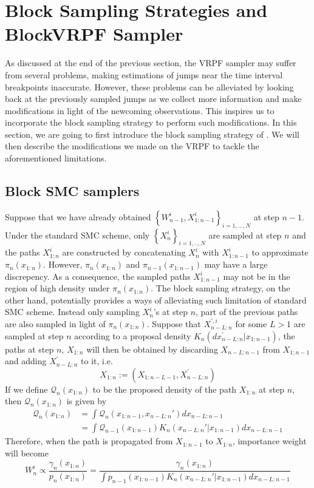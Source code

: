 \documentclass[12pt,a4paper]{article}
\begin{document}
\section{Block Sampling Strategies and BlockVRPF Sampler}
As discussed at the end of the previous section, the VRPF sampler may suffer from several problems, making estimations of jumps near the time interval breakpoints inaccurate. However, these problems can be alleviated by looking back at the previously sampled jumps as we collect more information and make modifications in light of the newcoming observations. This inspires us to incorporate the block sampling strategy to perform such modifications. In this section, we are going to first introduce the block sampling strategy of \cite{doucet2006efficient}. We will then describe the modifications we made on the VRPF to tackle the aforementioned limitations. 
\subsection{Block SMC samplers}
Suppose that we have already obtained $\left\{W_{n-1}^i,X_{1:n-1}^i\right\}_{i = 1,...,N}$ at step $n-1$. Under the standard SMC scheme, only \(\left\{X_n^{i}\right\}_{i=1,..,N}\) are sampled at step \(n\) and the paths \(X_{1:n}^i\) are constructed by concatenating \(X_n^i\) with \(X_{1:n-1}^i\) to approximate \(\pi_n(x_{1:n})\). However, \(\pi_n(x_{1:n})\) and \(\pi_{n-1}(x_{1:n-1})\) may have a large discrepency. As a consequence, the sampled paths \(X_{1:n-1}^i\) may not be in the region of high density under \(\pi_n(x_{1:n})\). The block sampling strategy, on the other hand, potentially provides a ways of alleviating such limitation of standard SMC scheme. Instead only sampling \(X_n^i\)'s at step \(n\), part of the previous paths are also sampled in light of \(\pi_n(x_{1:n})\). Suppose that $X_{n-L:n}^{',i}$ for some \(L>1\) are sampled at step \(n\) according to a proposal density $K_n(dx_{n-L:n}^{'}|x_{1:n-1})$, the paths at step \(n\), $X_{1:n}$ will then be obtained by discarding $X_{n-L:n-1}$ from $X_{1:n-1}$ and adding $X_{n-L:n}^{'}$ to it, i.e. 
\begin{equation}\label{eqn:BlockSMC Propogate}
    X_{1:n}:= (X_{1:n-L-1},X_{n-L:n}^{'})
\end{equation}
If we define $\mathcal{Q}_{n}(x_{1:n})$ to be the proposed density of the path $X_{1:n}$ at step $n$, then $\mathcal{Q}_n(x_{1:n})$ is given by
\begin{equation*}
    \begin{split}
        \mathcal{Q}_n(x_{1:n}) &= \int \mathcal{Q}_n(x_{1:n-1},x_{n-L:n}') dx_{n-L:n-1}\\
        &= \int \mathcal{Q}_{n-1}(x_{1:n-1}) K_n(x_{n-L:n}'|x_{1:n-1}) dx_{n-L:n-1}
    \end{split}
\end{equation*}
Therefore, when the path is propagated from $X_{1:n-1}$ to $X_{1:n}$, importance weight will become
\begin{equation*}
    W_n^i \propto \frac{\gamma_n(x_{1:n})}{p_n(x_{1:n})} = \frac{\gamma_n(x_{1:n})}{\int p_{n-1}(x_{1:n-1}) K_n(x_{n-L:n}'|x_{1:n-1}) dx_{n-L:n-1}}
\end{equation*}
\end{document}
